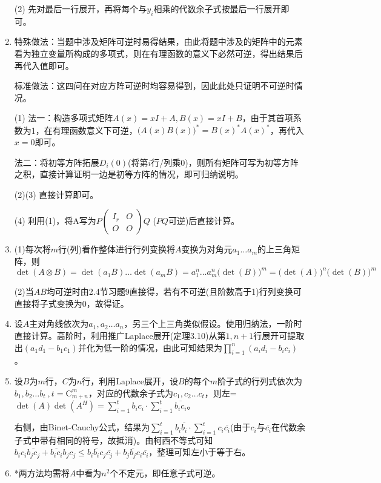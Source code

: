 \documentclass[a4paper,UTF8,fontset=windows]{ctexart}
\begin{document}
\begin{enumerate}
(2) 先对最后一行展开，再将每个与$y_i$相乘的代数余子式按最后一行展开即可。

\item
特殊做法：当题中涉及矩阵可逆时易得结果，由此将题中涉及的矩阵中的元素看为独立变量所构成的多项式，则在有理函数的意义下必然可逆，得出结果后再代入值即可。

标准做法：这四问在对应方阵可逆时均容易得到，因此此处只证明不可逆时情况。

(1) 法一：构造多项式矩阵$A(x)=xI+A,B(x)=xI+B$，由于其首项系数为1，在有理函数意义下可逆，$\big(A(x)B(x)\big)^\ast=B(x)^\ast A(x)^\ast$，再代入$x=0$即可。

法二：将初等方阵拓展$D_i(0)$(将第$i$行/列乘0)，则所有矩阵可写为初等方阵之积，直接计算证明一边是初等方阵的情况，即可归纳说明。

(2)(3) 直接计算即可。

(4) 利用(1)，将A写为$P\begin{pmatrix}I_r&O\\O&O\end{pmatrix}Q$ ($PQ$可逆)后直接计算。

\item
(1)每次将$m$行(列)看作整体进行行列变换将$A$变换为对角元$a_1\dots a_m$的上三角矩阵，则$\det(A\otimes B)=\det(a_1B)\dots\det(a_mB)=a_1^n\dots a_m^n\big(\det(B)\big)^m=\big(\det(A)\big)^n\big(\det(B)\big)^m$

(2)当$AB$均可逆时由2.4节习题9直接得，若有不可逆(且阶数高于1)行列变换可直接将子式变换为0，故得证。

\item
设$A$主对角线依次为$a_1,a_2\dots a_n$，另三个上三角类似假设。使用归纳法，一阶时直接计算。高阶时，利用推广Laplace展开(定理3.10)从第$1,n+1$行展开可提取出$(a_1d_1-b_1c_1)$并化为低一阶的情况，由此可知结果为$\prod_{i=1}^{n}(a_id_i-b_ic_i)$。

\item
设$B$为$m$行，$C$为$n$行，利用Laplace展开，设$B$的每个$m$阶子式的行列式依次为$b_1,b_2\dots b_t\ ,t=\mathrm{C}_{m+n}^m$，对应的代数余子式为$c_1,c_2\dots c_t$，则左=$\det(A)\det(A^H)=\sum_{i=1}^{t}b_ic_i\cdot\sum_{i=1}^{t}\overline{b_ic_i}$。

右侧，由Binet-Cauchy公式，结果为$\sum_{i=1}^{t}b_i\overline{b_i}\cdot\sum_{i=1}^{t}c_i\overline{c_i}$(由于$c_i$与$\overline{c_i}$在代数余子式中带有相同的符号，故抵消)。由柯西不等式可知$b_ic_i\overline{b_jc_j}+\overline{b_ic_i}b_jc_j\le b_i\overline{b_i}c_j\overline{c_j}+b_j\overline{b_j}c_i\overline{c_i}$，整理可知左小于等于右。

\item
*两方法均需将$A$中看为$n^2$个不定元，即任意子式可逆。


\end{enumerate}
\end{document}
